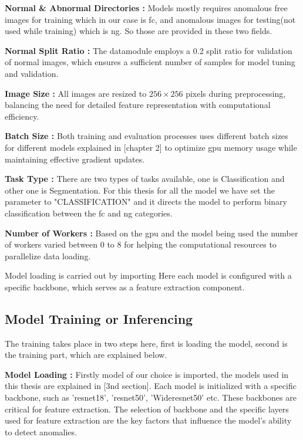 \textbf{Normal \& Abnormal Directories :} Models mostly requires anomalous free images for training which in our case is \gls{fc}, and anomalous images for testing(not used while training) which is \gls{ng}. So those are provided in these two fields.

\textbf{Normal Split Ratio :} The datamodule employs a 0.2 split ratio for validation of normal images, which ensures a sufficient number of samples for model tuning and validation.

\textbf{Image Size :} All images are resized to $256 \times 256$ pixels during preprocessing, balancing the need for detailed feature representation with computational efficiency.

\textbf{Batch Size :} Both training and evaluation processes uses different batch sizes for different models explained in [chapter 2] to optimize \gls{gpu} memory usage while maintaining effective gradient updates.

\textbf{Task Type :} There are two types of tasks available, one is Classification and other one is Segmentation. For this thesis for all the model we have set the parameter to "CLASSIFICATION" and it directs the model to perform binary classification between the \gls{fc} and \gls{ng} categories.

\textbf{Number of Workers :} Based on the \gls{gpu} and the model being used the number of workers varied between 0 to 8 for helping the computational resources to parallelize data loading.



Model loading is carried out by importing Here each model is configured with a specific backbone, which serves as a feature extraction component. 

\subsection{Model Training or Inferencing}
\label{subsec:Model Training}

The training takes place in two steps here, first is loading the model, second is the training part, which are explained below.

\textbf{Model Loading :} Firstly model of our choice is imported, the models used in this thesis are explained in [3nd section]. Each model is initialized with a specific backbone, such as '\gls{resnet}18', '\gls{resnet}50', 'Wide\gls{resnet}50' etc. These backbones are critical for feature extraction. The selection of backbone and the specific layers used for feature extraction are the key factors that influence the model's ability to detect anomalies.

